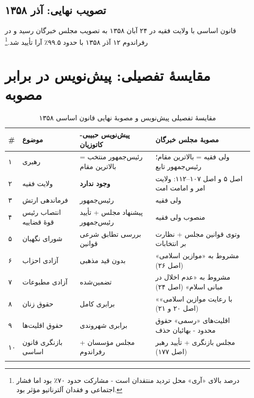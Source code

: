 \documentclass[12pt,a4paper]{book}
\newcommand{\keyword}[1]{\textbf{\textcolor{cPrimary}{#1}}}
\newcommand{\en}[1]{\lr{\textit{#1}}}
\begin{document}
\subsection{تصویب نهایی: آذر ۱۳۵۸}

قانون اساسی با ولایت فقیه در ۲۴ آبان ۱۳۵۸ به تصویب مجلس خبرگان رسید و در رفراندوم ۱۲ آذر ۱۳۵۸ با حدود ۹۹.۵٪ آرا تأیید شد.\footnote{\en{Schirazi (1997), pp.\,36--40.} درصد بالای «آری» محل تردید منتقدان است - مشارکت حدود ۷۰٪ بود اما فشار اجتماعی و فقدان آلترناتیو مؤثر بود.}

\section{مقایسهٔ تفصیلی: پیش‌نویس در برابر مصوبه}

\begin{longtable}{%
    >{\centering\arraybackslash}p{}
    >{\raggedleft\arraybackslash}p{}
    >{\raggedleft\arraybackslash}p{}
    >{\raggedleft\arraybackslash}p{}}
\toprule
\rowcolor{cPrimary!10}
\textbf{\#} & \textbf{موضوع} & \textbf{پیش‌نویس حبیبی-کاتوزیان} & \textbf{مصوبهٔ مجلس خبرگان} \\
\midrule
\endhead

۱ &
رهبری &
رئیس‌جمهور منتخب = بالاترین مقام &
ولی فقیه = بالاترین مقام؛ رئیس‌جمهور تابع \\
\midrule

۲ &
ولایت فقیه &
\keyword{وجود ندارد} &
اصل ۵ و اصل ۱۰۷–۱۱۲: ولایت امر و امامت امت \\
\midrule

۳ &
فرماندهی ارتش &
رئیس‌جمهور &
ولی فقیه \\
\midrule

۴ &
انتصاب رئیس قوهٔ قضاییه &
پیشنهاد مجلس + تأیید رئیس‌جمهور &
منصوب ولی فقیه \\
\midrule

۵ &
شورای نگهبان &
بررسی تطابق شرعی قوانین &
وتوی قوانین مجلس + نظارت بر انتخابات \\
\midrule

۶ &
آزادی احزاب &
بدون قید مذهبی &
مشروط به «موازین اسلامی» (اصل ۲۶) \\
\midrule

۷ &
آزادی مطبوعات &
تضمین‌شده &
مشروط به «عدم اخلال در مبانی اسلام» (اصل ۲۴) \\
\midrule

۸ &
حقوق زنان &
برابری کامل &
«با رعایت موازین اسلامی» (اصل ۲۰ و ۲۱) \\
\midrule

۹ &
حقوق اقلیت‌ها &
برابری شهروندی &
اقلیت‌های «رسمی» حقوق محدود - بهائیان حذف \\
\midrule

۱۰ &
بازنگری قانون اساسی &
مجلس مؤسسان + رفراندوم &
مجلس بازنگری + تأیید رهبر (اصل ۱۷۷) \\

\bottomrule
\caption{مقایسهٔ تفصیلی پیش‌نویس و مصوبهٔ نهایی قانون اساسی ۱۳۵۸}
\label{tab:constitution-detailed}
\end{longtable}
\end{document}
